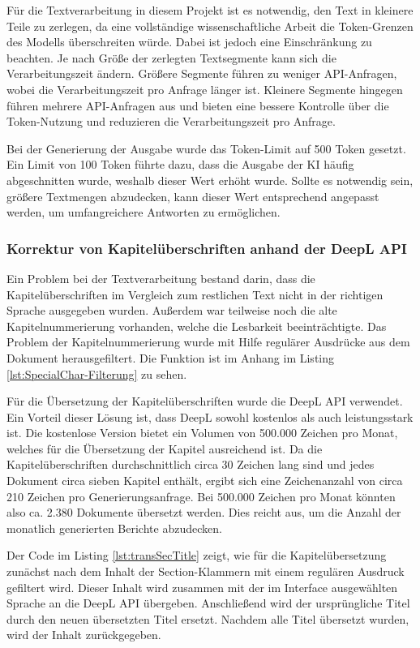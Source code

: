 Für die Textverarbeitung in diesem Projekt ist es notwendig, den Text in kleinere Teile zu zerlegen, da eine vollständige wissenschaftliche Arbeit die Token-Grenzen des Modells überschreiten würde. Dabei ist jedoch eine Einschränkung zu beachten. Je nach Größe der zerlegten Textsegmente kann sich die Verarbeitungszeit ändern. Größere Segmente führen zu weniger \ac{API}-Anfragen, wobei die Verarbeitungszeit pro Anfrage länger ist. Kleinere Segmente hingegen führen mehrere \ac{API}-Anfragen aus und bieten eine bessere Kontrolle über die Token-Nutzung und reduzieren die Verarbeitungszeit pro Anfrage.

Bei der Generierung der Ausgabe wurde das Token-Limit auf 500 Token gesetzt. Ein Limit von 100 Token führte dazu, dass die Ausgabe der \ac{KI} häufig abgeschnitten wurde, weshalb dieser Wert erhöht wurde. Sollte es notwendig sein, größere Textmengen abzudecken, kann dieser Wert entsprechend angepasst werden, um umfangreichere Antworten zu ermöglichen.

\subsubsection{Korrektur von Kapitelüberschriften anhand der DeepL \ac{API}}

Ein Problem bei der Textverarbeitung bestand darin, dass die Kapitelüberschriften im Vergleich zum restlichen Text nicht in der richtigen Sprache ausgegeben wurden. Außerdem war teilweise noch die alte Kapitelnummerierung vorhanden, welche die Lesbarkeit beeinträchtigte. Das Problem der Kapitelnummerierung wurde mit Hilfe regulärer Ausdrücke aus dem Dokument herausgefiltert. Die Funktion ist im Anhang im Listing \ref{lst:SpecialChar-Filterung} zu sehen.

Für die Übersetzung der Kapitelüberschriften wurde die DeepL \ac{API} verwendet. Ein Vorteil dieser Lösung ist, dass DeepL sowohl kostenlos als auch leistungsstark ist. Die kostenlose Version bietet ein Volumen von 500.000 Zeichen pro Monat, welches für die Übersetzung der Kapitel ausreichend ist. Da die Kapitelüberschriften durchschnittlich circa 30 Zeichen lang sind und jedes Dokument circa sieben Kapitel enthält, ergibt sich eine Zeichenanzahl von circa 210 Zeichen pro Generierungsanfrage. Bei 500.000 Zeichen pro Monat könnten also ca. 2.380 Dokumente übersetzt werden. Dies reicht aus, um die Anzahl der monatlich generierten Berichte abzudecken.

Der Code im Listing \ref{lst:transSecTitle} zeigt, wie für die Kapitelübersetzung zunächst nach dem Inhalt der Section-Klammern mit einem regulären Ausdruck gefiltert wird. Dieser Inhalt wird zusammen mit der im Interface ausgewählten Sprache an die DeepL \ac{API} übergeben. Anschließend wird der ursprüngliche Titel durch den neuen übersetzten Titel ersetzt. Nachdem alle Titel übersetzt wurden, wird der Inhalt zurückgegeben. 

